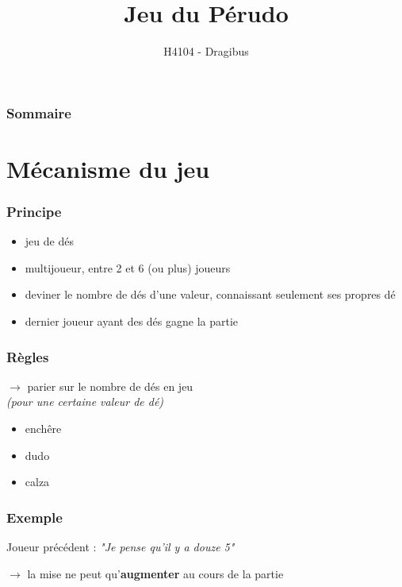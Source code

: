 \documentclass{beamer}
\title{Jeu du Pérudo}
\author{H4104 - Dragibus}
\institute{INSA de Lyon}
\begin{document}
\begin{frame}
    \titlepage
\end{frame}

\begin{frame}
    \frametitle{Sommaire}
    \tableofcontents[hideallsubsections]
\end{frame}

\section{Mécanisme du jeu}

\begin{frame}
    \frametitle{Principe}
    \begin{itemize}
        \item jeu de dés
        \item multijoueur, entre 2 et 6 (ou plus) joueurs
        \item deviner le nombre de dés d'une valeur, connaissant seulement ses propres dé
        \item dernier joueur ayant des dés gagne la partie
    \end{itemize}
\end{frame}

\begin{frame}
\frametitle{Règles}
    $\to$ parier sur le nombre de dés en jeu \\
    \emph{(pour une certaine valeur de dé)}

    \begin{itemize}
        \item enchêre
        \item dudo
        \item calza
    \end{itemize}
\end{frame}

\begin{frame}
    \frametitle{Exemple}


    \begin{center}
        \begin{large}
            Joueur précédent : \textit{"Je pense qu'il y a douze 5"} \\
        \end{large}
    \end{center}

    $\to$ la mise ne peut qu'\textbf{augmenter} au cours de la partie
\end{frame}
\end{document}
